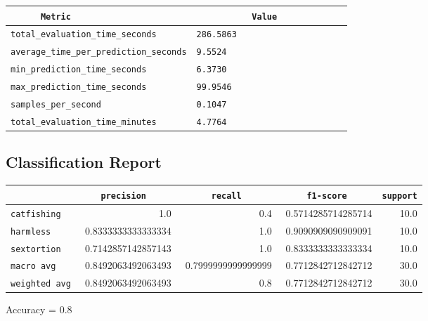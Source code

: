 \documentclass{article}
\begin{document}
\begin{center}
\begin{tabular}{l | l} \hline
    \verb|      Metric     | & \verb|           Value           | \\ \hline
    \hline
    \verb|total_evaluation_time_seconds| & \verb|286.5863                     | \\ \hline
    \verb|average_time_per_prediction_seconds| & \verb|9.5524                       | \\ \hline
    \verb|min_prediction_time_seconds| & \verb|6.3730                       | \\ \hline
    \verb|max_prediction_time_seconds| & \verb|99.9546                      | \\ \hline
    \verb|samples_per_second| & \verb|0.1047                       | \\ \hline
    \verb|total_evaluation_time_minutes| & \verb|4.7764                       | \\ \hline
\end{tabular}
\end{center}

\subsection{Classification Report}

\begin{center}
\begin{tabular}{l | r | r | r | r} \hline
    \verb|            | & \verb|    precision     | & \verb|      recall      | & \verb|     f1-score     | & \verb|support| \\ \hline
    \hline
    \verb|catfishing | & 1.0 & 0.4 & 0.5714285714285714 &    10.0 \\ \hline
    \verb|harmless   | & 0.8333333333333334 & 1.0 & 0.9090909090909091 &    10.0 \\ \hline
    \verb|sextortion | & 0.7142857142857143 & 1.0 & 0.8333333333333334 &    10.0 \\ \hline
    \verb|macro avg  | & 0.8492063492063493 & 0.7999999999999999 & 0.7712842712842712 &    30.0 \\ \hline
    \verb|weighted avg| & 0.8492063492063493 & 0.8 & 0.7712842712842712 &    30.0 \\ \hline
\end{tabular}
\end{center}

\begin{center}
Accuracy = 0.8
\end{center}
\end{document}
